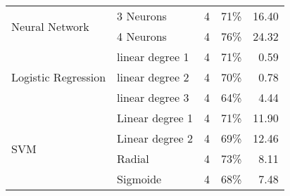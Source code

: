 \documentclass[10pt,letterpaper,oneside]{article}
\begin{document}
\begin{table}[]
\begin{tabular}{llrrr}
		\multirow{2}{*}{Neural Network}         & 3 Neurons                            & 4                                              & 71\%                                   & 16.40                                            \\
		& 4 Neurons                            & 4                                              & 76\%                                   & 24.32                                            \\
		\multirow{3}{*}{Logistic Regression}    & linear degree 1                      & 4                                              & 71\%                                   & 0.59                                             \\
		& linear degree 2                      & 4                                              & 70\%                                   & 0.78                                             \\
		& linear degree 3                      & 4                                              & 64\%                                   & 4.44                                             \\
		\multirow{4}{*}{SVM}                    & Linear degree 1                      & 4                                              & 71\%                                   & 11.90                                            \\
		& Linear degree 2                      & 4                                              & 69\%                                   & 12.46                                            \\
		& Radial                               & 4                                              & 73\%                                   & 8.11                                             \\
		& Sigmoide                             & 4                                              & 68\%                                   & 7.48                                             \\ \hline
	\end{tabular}
\end{table}
\end{document}
